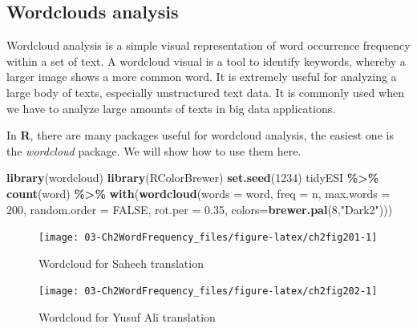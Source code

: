 \documentclass[
]{article}
\newenvironment{Shaded}{\begin{snugshade}}{\end{snugshade}}
\newcommand{\AttributeTok}[1]{\textcolor[rgb]{0.13,0.29,0.53}{#1}}
\newcommand{\ConstantTok}[1]{\textcolor[rgb]{0.56,0.35,0.01}{#1}}
\newcommand{\DecValTok}[1]{\textcolor[rgb]{0.00,0.00,0.81}{#1}}
\newcommand{\FloatTok}[1]{\textcolor[rgb]{0.00,0.00,0.81}{#1}}
\newcommand{\FunctionTok}[1]{\textcolor[rgb]{0.13,0.29,0.53}{\textbf{#1}}}
\newcommand{\NormalTok}[1]{#1}
\newcommand{\SpecialCharTok}[1]{\textcolor[rgb]{0.81,0.36,0.00}{\textbf{#1}}}
\newcommand{\StringTok}[1]{\textcolor[rgb]{0.31,0.60,0.02}{#1}}
\begin{document}
\hypertarget{wordcloud-analysis}{%
\subsection{Wordclouds analysis}\label{wordcloud-analysis}}

Wordcloud analysis is a simple visual representation of word occurrence frequency within a set of text. A wordcloud visual is a tool to identify keywords, whereby a larger image shows a more common word. It is extremely useful for analyzing a large body of texts, especially unstructured text data. It is commonly used when we have to analyze large amounts of texts in big data applications.

In \textbf{R}, there are many packages useful for wordcloud analysis, the easiest one is the \emph{wordcloud} package. We will show how to use them here.

\begin{Shaded}
\begin{Highlighting}[]
\FunctionTok{library}\NormalTok{(wordcloud)}
\FunctionTok{library}\NormalTok{(RColorBrewer) }
\FunctionTok{set.seed}\NormalTok{(}\DecValTok{1234}\NormalTok{)}
\NormalTok{tidyESI }\SpecialCharTok{\%\textgreater{}\%}
  \FunctionTok{count}\NormalTok{(word) }\SpecialCharTok{\%\textgreater{}\%}
  \FunctionTok{with}\NormalTok{(}\FunctionTok{wordcloud}\NormalTok{(}\AttributeTok{words =}\NormalTok{ word, }
                 \AttributeTok{freq =}\NormalTok{ n, }
                 \AttributeTok{max.words =} \DecValTok{200}\NormalTok{,}
                 \AttributeTok{random.order =} \ConstantTok{FALSE}\NormalTok{,}
                 \AttributeTok{rot.per =} \FloatTok{0.35}\NormalTok{,}
                 \AttributeTok{colors=}\FunctionTok{brewer.pal}\NormalTok{(}\DecValTok{8}\NormalTok{,}\StringTok{"Dark2"}\NormalTok{)))}
\end{Highlighting}
\end{Shaded}

\begin{figure}

{\centering \texttt{[image: 03-Ch2WordFrequency\_files/figure-latex/ch2fig201-1]} 

}

\caption{Wordcloud for Saheeh translation}\label{fig:ch2fig201}
\end{figure}

\begin{figure}

{\centering \texttt{[image: 03-Ch2WordFrequency\_files/figure-latex/ch2fig202-1]} 

}

\caption{Wordcloud for Yusuf Ali translation}\label{fig:ch2fig202}
\end{figure}
\end{document}
